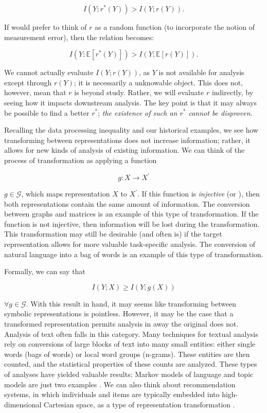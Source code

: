 \documentclass[12pt]{book}
\begin{document}
\[
I(Y; r^*(Y)) > I(Y; r(Y)).
\]

If would prefer to think of $r$ as a random function (to incorporate the notion of measurement error), then the relation becomes:

\[
I(Y; \mathbb{E}[r^*(Y)]) > I(Y; \mathbb{E}[r(Y)]).
\]

We cannot actually evaluate $I(Y; r(Y))$, as $Y$ is not available for analysis except through $r(Y)$; it is necessarily a unknowable object.
This does not, however, mean that $r$ is beyond study.
Rather, we will evaluate $r$ indirectly, by seeing how it impacts downstream analysis.
The key point is that it may always be possible to find a better $r^*$; \textit{the existence of such an $r^*$ cannot be disproven.}

\bigskip

Recalling the data processing inequality and our historical examples, we see how transforming between representations does not increase information; rather, it allows for new kinds of analysis of existing information.
We can think of the process of transformation as applying a function

\[
g: X \rightarrow X^\prime
\]

$g \in \mathcal{G}$, which maps representation $X$ to $X^\prime$.
If this function is \textit{injective} (or ), then both representations contain the same amount of information.
The conversion between graphs and matrices is an example of this type of transformation.
If the function is not injective, then information will be lost during the transformation.
This transformation may still be desirable (and often is) if the target representation allows for more valuable task-specific analysis.
The conversion of natural language into a bag of words is an example of this type of transformation.

Formally, we can say that

\[
I(Y; X) \geq I(Y; g(X))
\]

$\forall g \in \mathcal{G}$. With this result in hand, it may seems like transforming between symbolic representations is pointless.
However, it may be the case that a transformed representation permits analysis in away the original does not.
Analysis of text often falls in this category.
Many techniques for textual analysis rely on conversions of large blocks of text into many small entities: either single words (bags of words) or local word groups (n-grams).
These entities are then counted, and the statistical properties of these counts are analyzed.
These types of analyses have yielded valuable results: Markov models of language and topic models are just two examples \cite{blei}.
We can also think about recommendation systems, in which individuals and items are typically embedded into high-dimensional Cartesian space, as a type of representation transformation \cite{koren}.
\end{document}
